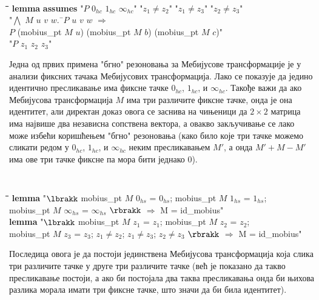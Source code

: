 {\tt
\begin{tabbing}
\hspace{5mm}\=\hspace{5mm}\=\hspace{5mm}\=\hspace{5mm}\=\hspace{5mm}\=\kill
{\bf lemma} {\bf assumes} "$P$ $0_{hc}$ $1_{hc}$ $\infty_{hc}$" "$z_1 \neq z_2$" "$z_1 \neq z_3$" "$z_2 \neq z_3$"\\
\>"$\bigwedge$ $M$ $u$ $v$ $w$.\ \=$P$ $u$ $v$ $w$ $\Longrightarrow$ \\
\>\> $P$ (mobius\_pt $M$ $u$) (mobius\_pt $M$ $b$) (mobius\_pt $M$ $c$)"\\
 "$P$ $z_1$ $z_2$ $z_3$"
\end{tabbing}
}

Једна од првих примена "бгно" резоновања за Мебијусове трансформације
је у анализи фиксних тачака Мебијусових трансформација. Лако се
показује да једино идентично пресликавање има фиксне тачке $0_{hc}$,
$1_{hc}$, и $\infty_{hc}$. Такође важи да ако Мебијусова
трансформација $M$ има три различите фиксне тачке, онда је она
идентитет, али директан доказ овога се заснива на чињеници да $2\times
2$ матрица има највише два независна сопствена вектора, а овакво
закључивање се лако може избећи коришћењем "бгно" резоновања (како
било које три тачке можемо сликати редом у $0_{hc}$, $1_{hc}$, и
$\infty_{hc}$ неким пресликавањем $M'$, а онда $M'+M-M'$ има ове три
тачке фиксне па мора бити једнако $0$).

{\tt
\begin{tabbing}
\hspace{5mm}\=\hspace{5mm}\=\hspace{5mm}\=\hspace{5mm}\=\hspace{5mm}\=\kill
{\bf lemma} "$\lbrakk$ mobius\_pt $M$ $0_{hs}$ = $0_{hs}$; mobius\_pt $M$ $1_{hs}$ = $1_{hs}$; \\
\>mobius\_pt $M$ $\infty_{hs}$ = $\infty_{hs}$ $\rbrakk$ $\Longrightarrow$ M = id\_mobius"\\
{\bf lemma} "$\lbrakk$ mobius\_pt $M$ $z_1$ = $z_1$; mobius\_pt $M$ $z_2$ = $z_2$; \\
\>mobius\_pt $M$ $z_3$ = $z_3$; $z_1 \neq z_2$; $z_1 \neq z_3$; $z_2 \neq z_3$ $\rbrakk$ $\Longrightarrow$ M = id\_mobius"
\end{tabbing}
}

Последица овога је да постоји јединствена Мебијусова трансформација
која слика три различите тачке у друге три различите тачке (већ је
показано да такво пресликавање постоји, а ако би постојала два таква
пресликавања онда би њихова разлика морала имати три фиксне тачке, што
значи да би била идентитет).

